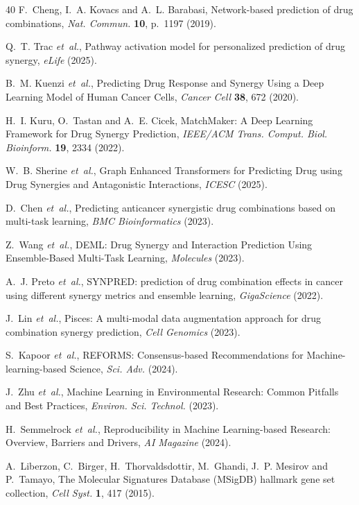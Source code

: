 \documentclass{ws-procs11x85}
\begin{document}
\begin{thebibliography}{40}
F.~Cheng, I.~A. Kovacs and A.~L. Barabasi, Network-based prediction of drug
  combinations, {\it Nat. Commun.} {\bf 10}, p.~1197 (2019).

Q.~T. Trac {\it et~al.}, Pathway activation model for personalized prediction of
  drug synergy, {\it eLife}  (2025).

B.~M. Kuenzi {\it et~al.}, Predicting Drug Response and Synergy Using a Deep
  Learning Model of Human Cancer Cells, {\it Cancer Cell} {\bf 38}, 672 (2020).

H.~I. Kuru, O.~Tastan and A.~E. Cicek, MatchMaker: A Deep Learning Framework for
  Drug Synergy Prediction, {\it IEEE/ACM Trans. Comput. Biol. Bioinform.} {\bf
  19}, 2334 (2022).

W.~B. Sherine {\it et~al.}, Graph Enhanced Transformers for Predicting Drug
  using Drug Synergies and Antagonistic Interactions, {\it ICESC}  (2025).

D.~Chen {\it et~al.}, Predicting anticancer synergistic drug combinations based
  on multi-task learning, {\it BMC Bioinformatics}  (2023).

Z.~Wang {\it et~al.}, DEML: Drug Synergy and Interaction Prediction Using
  Ensemble-Based Multi-Task Learning, {\it Molecules}  (2023).

A.~J. Preto {\it et~al.}, SYNPRED: prediction of drug combination effects in
  cancer using different synergy metrics and ensemble learning, {\it
  GigaScience}  (2022).

J.~Lin {\it et~al.}, Pisces: A multi-modal data augmentation approach for drug
  combination synergy prediction, {\it Cell Genomics}  (2023).

S.~Kapoor {\it et~al.}, REFORMS: Consensus-based Recommendations for
  Machine-learning-based Science, {\it Sci. Adv.}  (2024).

J.~Zhu {\it et~al.}, Machine Learning in Environmental Research: Common Pitfalls
  and Best Practices, {\it Environ. Sci. Technol.}  (2023).

H.~Semmelrock {\it et~al.}, Reproducibility in Machine Learning-based Research:
  Overview, Barriers and Drivers, {\it AI Magazine}  (2024).

A.~Liberzon, C.~Birger, H.~Thorvaldsdottir, M.~Ghandi, J.~P. Mesirov and
  P.~Tamayo, The Molecular Signatures Database (MSigDB) hallmark gene set
  collection, {\it Cell Syst.} {\bf 1}, 417 (2015).


\end{thebibliography}
\end{document}
